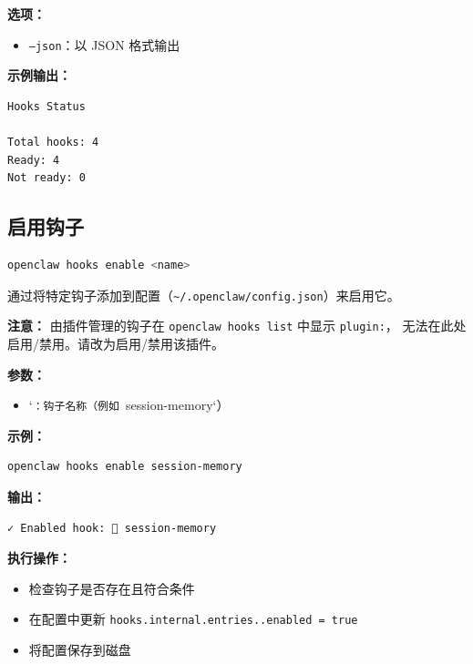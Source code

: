 \textbf{选项：}

\begin{itemize}
  \item \texttt{--json}：以 JSON 格式输出
\end{itemize}


\textbf{示例输出：}

\begin{lstlisting}
Hooks Status

Total hooks: 4
Ready: 4
Not ready: 0
\end{lstlisting}


\subsection{启用钩子}


\begin{lstlisting}[language=bash]
openclaw hooks enable <name>
\end{lstlisting}


通过将特定钩子添加到配置（\texttt{\textasciitilde{}/.openclaw/config.json}）来启用它。

\textbf{注意：} 由插件管理的钩子在 \texttt{openclaw hooks list} 中显示 \texttt{plugin:}，
无法在此处启用/禁用。请改为启用/禁用该插件。

\textbf{参数：}

\begin{itemize}
  \item `\texttt{：钩子名称（例如 }session-memory`）
\end{itemize}


\textbf{示例：}

\begin{lstlisting}[language=bash]
openclaw hooks enable session-memory
\end{lstlisting}


\textbf{输出：}

\begin{lstlisting}
✓ Enabled hook: 💾 session-memory
\end{lstlisting}


\textbf{执行操作：}

\begin{itemize}
  \item 检查钩子是否存在且符合条件
  \item 在配置中更新 \texttt{hooks.internal.entries..enabled = true}
  \item 将配置保存到磁盘
\end{itemize}


